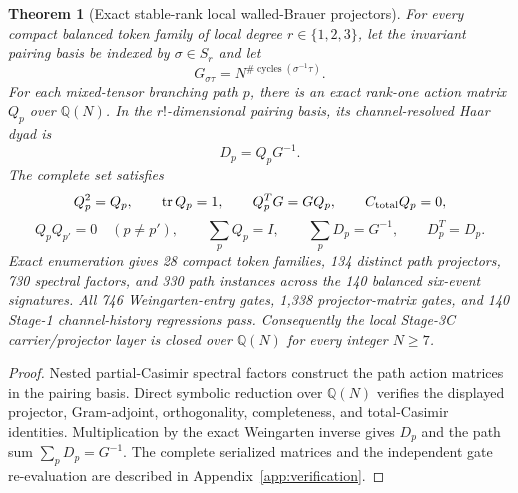 \documentclass[11pt]{article}
\newtheorem{theorem}{Theorem}[section]
\begin{document}
\begin{theorem}[Exact stable-rank local walled-Brauer projectors]
\label{thm:wbprojectors}
For every compact balanced token family of local degree
$r\in\{1,2,3\}$, let the invariant pairing basis be indexed by
$\sigma\in S_r$ and let
\[
G_{\sigma\tau}=N^{\#\operatorname{cycles}(\sigma^{-1}\tau)}.
\]
For each mixed-tensor branching path $p$, there is an exact rank-one action
matrix $Q_p$ over $\mathbb Q(N)$. In the $r!$-dimensional pairing basis, its
channel-resolved Haar dyad is
\[
D_p=Q_pG^{-1}.
\]
The complete set satisfies
\[
Q_p^2=Q_p,\qquad \operatorname{tr}Q_p=1,\qquad
Q_p^TG=GQ_p,\qquad C_{\rm total}Q_p=0,
\]
\[
Q_pQ_{p'}=0\quad(p\ne p'),\qquad
\sum_pQ_p=I,\qquad \sum_pD_p=G^{-1},\qquad D_p^T=D_p.
\]
Exact enumeration gives 28 compact token families, 134 distinct path
projectors, 730 spectral factors, and 330 path instances across the 140
balanced six-event signatures. All 746 Weingarten-entry gates, 1,338
projector-matrix gates, and 140 Stage-1 channel-history regressions pass.
Consequently the local Stage-3C carrier/projector layer is closed over
$\mathbb Q(N)$ for every integer $N\geq7$.
\end{theorem}

\begin{proof}
Nested partial-Casimir spectral factors construct the path action matrices in
the pairing basis. Direct symbolic reduction over $\mathbb Q(N)$ verifies the
displayed projector, Gram-adjoint, orthogonality, completeness, and total-Casimir
identities. Multiplication by the exact Weingarten inverse gives $D_p$ and the
path sum $\sum_pD_p=G^{-1}$. The complete serialized matrices and the
independent gate re-evaluation are described in
Appendix~\ref{app:verification}.
\end{proof}
\end{document}
